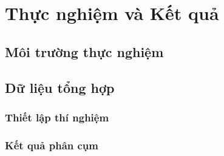 
\section{Thực nghiệm và Kết quả}
\label{sec:experiments}

\subsection{Môi trường thực nghiệm}



\subsection{Dữ liệu tổng hợp}

\subsubsection{Thiết lập thí nghiệm}

\subsubsection{Kết quả phân cụm}


